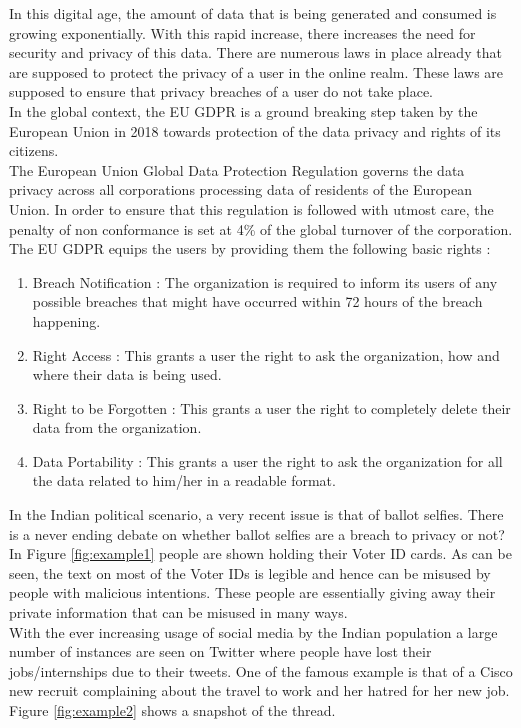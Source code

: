 \documentclass[a4paper,11pt]{article}
\begin{document}
In this digital age, the amount of data that is being generated and consumed is growing exponentially. With this rapid increase, there increases the need for security and privacy of this data.
There are numerous laws in place already that are supposed to protect the privacy of a user in the online realm. These laws are supposed to ensure that privacy breaches of a user do not take place.
\medskip\\
In the global context, the EU GDPR is a ground breaking step taken by the European Union in 2018 towards protection of the data privacy and rights of its citizens.\medskip\\
The European Union Global Data Protection Regulation governs the data privacy across all corporations processing data of residents of the European Union. In order to ensure that this regulation is followed with utmost care, the penalty of non conformance is set at 4\% of the global turnover of the corporation.
\medskip\\
The EU GDPR equips the users by providing them the following basic rights :
\begin{enumerate}
    \item Breach Notification :
    The organization is required to inform its users of any possible breaches that might have occurred within 72 hours of the breach happening.
    \item Right Access : This grants a user the right to ask the organization, how and where their data is being used.
    \item Right to be Forgotten : This grants a user the right to completely delete their data from the organization.
    \item Data Portability : This grants a user the right to ask the organization for all the data related to him/her in a readable format.
\end{enumerate}
In the Indian political scenario, a very recent issue is that of ballot selfies. There is a never ending debate on whether ballot selfies are a breach to privacy or not? In Figure \ref{fig:example1} people are shown holding their Voter ID cards. As can be seen, the text on most of the Voter IDs is legible and hence can be misused by people with malicious intentions. These people are essentially giving away their private information that can be misused in many ways.
\medskip\\
With the ever increasing usage of social media by the Indian population a large number of instances are seen on Twitter where people have lost their jobs/internships due to their tweets. One of the famous example is that of a Cisco new recruit complaining about the travel to work and her hatred for her new job. Figure \ref{fig:example2} shows a snapshot of the thread.
\end{document}
